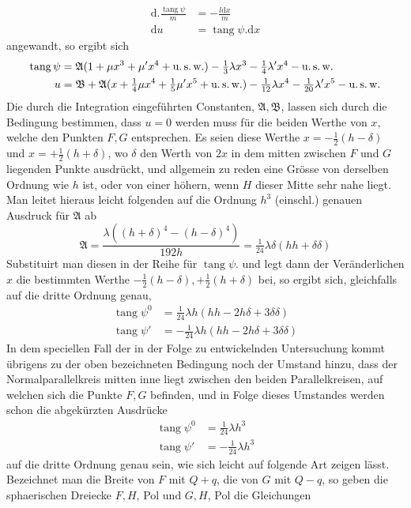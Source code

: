 %
\[
\begin{aligned}
\mathrm{d}\mathord{.}\frac{\operatorname{tang}\psi}{m}&=-\frac{l\mathrm{d}x}{m}\\
\mathrm{d}u&=\operatorname{tang}\psi\mathord{.}\mathrm{d}x
\end{aligned}
\]
angewandt, so ergibt sich
\[
\begin{aligned}
\operatorname{tang}\psi&=\mathfrak{A}(1+\mu x^3+\mu'x^4+\text{u.\,s.\,w.})-\tfrac{1}{3}\lambda x^3-\tfrac{1}{4}\lambda'x^4-\text{u.\,s.\,w.}\\
u&=\mathfrak{B}+\mathfrak{A}(x+\tfrac{1}{4}\mu x^4+\tfrac{1}{5}\mu'x^5+\text{u.\,s.\,w.})-\tfrac{1}{12}\lambda x^4-\tfrac{1}{20}\lambda'x^5-\text{u.\,s.\,w.}
\end{aligned}
\]
\indent Die durch die Integration eingeführten Constanten, \(\mathfrak{A},\mathfrak{B}\), lassen sich durch die Bedingung bestimmen, dass \(u=0\) werden muss für die beiden Werthe von \(x\), welche den Punkten \(F,G\) entsprechen. Es seien diese Werthe \(x=-\tfrac{1}{2}(h-\delta)\) und \(x=+\tfrac{1}{2}(h+\delta)\), wo \(\delta\) den Werth von \(2x\) in dem mitten zwischen \(F\) und \(G\) liegenden Punkte ausdrückt, und allgemein zu reden eine Grösse von derselben Ordnung wie \(h\) ist, oder von einer höhern, wenn \(H\) dieser Mitte sehr nahe liegt. Man leitet hieraus leicht folgenden auf die Ordnung \(h^3\) (einschl.) genauen Ausdruck für \(\mathfrak{A}\) ab
\[
\mathfrak{A}=\frac{\lambda((h+\delta)^4-(h-\delta)^4)}{192h}=\tfrac{1}{24}\lambda\delta(hh+\delta\delta)
\]
\indent Substituirt man diesen in der Reihe für \(\operatorname{tang}\psi\). und legt dann der Veränderlichen \(x\) die bestimmten Werthe \(-\tfrac{1}{2}(h-\delta),+\tfrac{1}{2}(h+\delta)\) bei, so ergibt sich, gleichfalls auf die dritte Ordnung genau,
\[
\begin{aligned}
\operatorname{tang}\psi^0&=\tfrac{1}{24}\lambda h(hh-2h\delta+3\delta\delta)\\
\operatorname{tang}\psi'&=-\tfrac{1}{24}\lambda h(hh-2h\delta+3\delta\delta)
\end{aligned}
\]
\indent In dem speciellen Fall der in der Folge zu entwickelnden Untersuchung kommt übrigens zu der oben bezeichneten Bedingung noch der Umstand hinzu, dass der Normalparallelkreis mitten inne liegt zwischen den beiden Parallelkreisen, auf welchen sich die Punkte \(F,G\) befinden, und in Folge dieses Umstandes werden schon die abgekürzten Ausdrücke
\[
\begin{aligned}
\operatorname{tang}\psi^0&=\tfrac{1}{24}\lambda h^3\\
\operatorname{tang}\psi'&=-\tfrac{1}{24}\lambda h^3
\end{aligned}
\]
auf die dritte Ordnung genau sein, wie sich leicht auf folgende Art zeigen lässt. Bezeichnet man die Breite von \(F\) mit \(Q+q\), die von \(G\) mit \(Q-q\), so geben die sphaerischen Dreiecke \(F,H\), Pol und \(G,H\), Pol die Gleichungen
